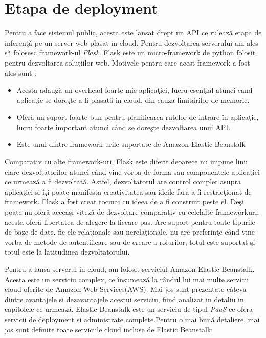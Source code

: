 \documentclass[a4paper,12pt]{report}
\begin{document}
\section{Etapa de deployment}
Pentru a face sistemul public, acesta este lansat drept un API ce rulează etapa de inferenţă pe un server web plasat in cloud. Pentru dezvoltarea serverului am ales să folosesc framework-ul \emph{Flask}. Flask este un micro-framework de python folosit pentru dezvoltarea soluţiilor web. Motivele pentru care acest framework a fost ales sunt : 
\begin{itemize}
\item Acesta adaugă un overhead foarte mic aplicaţiei, lucru esenţial atunci cand aplicaţie se doreşte a fi plasată in cloud, din cauza limitărilor de memorie. 
\item Oferă un suport foarte bun pentru planificarea rutelor de intrare în aplicaţie, lucru foarte important atunci când se doreşte dezvoltarea unui API.
\item Este unul dintre framework-urile suportate de Amazon Elastic Beanstalk 
\end{itemize}
\par
Comparativ cu alte framework-uri, Flask este diferit deoarece nu impune linii clare dezvoltatorilor atunci când vine vorba de forma sau componentele aplicaţiei ce urmează a fi dezvoltată. Astfel, dezvoltatorul are control complet asupra aplicaţiei si îşi poate manifesta creativitatea sau ideile fara a fi restricţionat de framework.  Flask a fost creat tocmai cu ideea de a fi construit peste el. Deşi poate nu oferă aceeaşi viteză de dezvoltare comparativ cu celelalte frameworkuri, acesta oferă libertatea de alegere la fiecare pas. Are suport pentru toate tipurile de baze de date, fie ele relaţionale sau nerelaţionale,  nu are preferinţe când vine vorba de metode de autentificare sau de creare a rolurilor, totul este suportat şi totul este la latitudinea dezvoltatorului. 
\cite{flask2014}
\par
Pentru a lansa serverul in cloud, am folosit serviciul Amazon Elastic Beanstalk. Acesta este un serviciu complex, ce însumează la rândul lui mai multe servicii cloud oferite de Amazon Web Services(AWS). Mai jos sunt prezentate câteva dintre avantajele si dezavantajele acestui serviciu, fiind analizat in detaliu in capitolele ce urmează.  Elastic Beanstalk este un serviciu de tipul \emph{PaaS}  ce ofera servicii de deployment si administrate complete.Pentru o mai bună detaliere, mai jos sunt definite toate serviciile cloud incluse de Elastic Beanstalk: 
\end{document}
